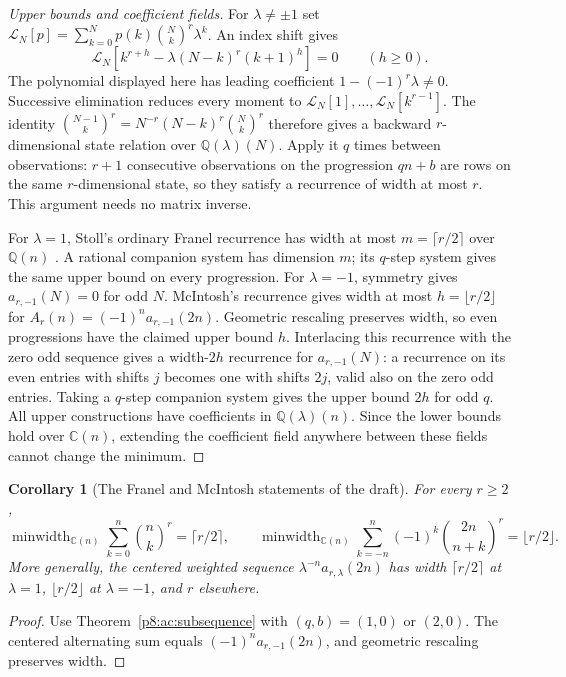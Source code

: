\documentclass[11pt,a4paper]{article}
\newtheorem{corollary}[theorem]{Corollary}
\theoremstyle{definition}
\theoremstyle{remark}
\numberwithin{equation}{section}
\begin{document}
\begin{proof}[Upper bounds and coefficient fields]
For $\lambda\ne\pm1$ set
$\mathcal L_N[p]=\sum_{k=0}^Np(k)\binom Nk^r\lambda^k$.
An index shift gives
\[
 \mathcal L_N[k^{r+h}-\lambda(N-k)^r(k+1)^h]=0
 \qquad(h\ge0).
\]
The polynomial displayed here has leading coefficient
$1-(-1)^r\lambda\ne0$. Successive elimination reduces every moment
to $\mathcal L_N[1],\ldots,\mathcal L_N[k^{r-1}]$.
The identity
$\binom{N-1}{k}^r=N^{-r}(N-k)^r\binom Nk^r$
therefore gives a backward $r$-dimensional state relation over
$\mathbb Q(\lambda)(N)$. Apply it $q$ times between observations:
$r+1$ consecutive observations on the progression $qn+b$ are rows
on the same $r$-dimensional state, so they satisfy a recurrence of
width at most $r$. This argument needs no matrix inverse.

For $\lambda=1$, Stoll's ordinary Franel recurrence has width at
most $m=\lceil r/2\rceil$ over $\mathbb Q(n)$
\cite{p3:Stoll1997}. A rational companion system has dimension $m$;
its $q$-step system gives the same upper bound on every progression.
For $\lambda=-1$, symmetry gives $a_{r,-1}(N)=0$ for odd $N$.
McIntosh's recurrence \cite[Theorem 1]{p3:McIntosh1993} gives width
at most $h=\lfloor r/2\rfloor$ for
$A_r(n)=(-1)^n a_{r,-1}(2n)$. Geometric rescaling preserves width,
so even progressions have the claimed upper bound $h$. Interlacing
this recurrence with the zero odd sequence gives a width-$2h$
recurrence for $a_{r,-1}(N)$: a recurrence on its even entries with
shifts $j$ becomes one with shifts $2j$, valid also on the zero
odd entries. Taking a $q$-step companion system gives the upper
bound $2h$ for odd $q$. All upper constructions have coefficients
in $\mathbb Q(\lambda)(n)$. Since the lower bounds hold over
$\mathbb C(n)$, extending the coefficient field anywhere between
these fields cannot change the minimum.
\end{proof}

\begin{corollary}[The Franel and McIntosh statements of the draft]
\label{p8:ac:oldEF}
For every $r\ge2$,
\[
 \operatorname{minwidth}_{\mathbb C(n)}
       \sum_{k=0}^n\binom nk^r=\lceil r/2\rceil,
 \qquad
 \operatorname{minwidth}_{\mathbb C(n)}
       \sum_{k=-n}^n(-1)^k\binom{2n}{n+k}^r=\lfloor r/2\rfloor.
\]
More generally, the centered weighted sequence
$\lambda^{-n}a_{r,\lambda}(2n)$ has width
$\lceil r/2\rceil$ at $\lambda=1$, $\lfloor r/2\rfloor$ at
$\lambda=-1$, and $r$ elsewhere.
\end{corollary}
\begin{proof}
Use Theorem~\ref{p8:ac:subsequence} with $(q,b)=(1,0)$ or $(2,0)$.
The centered alternating sum equals $(-1)^na_{r,-1}(2n)$, and
geometric rescaling preserves width.
\end{proof}
\end{document}
